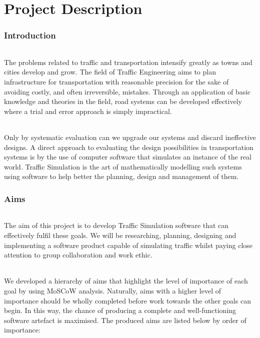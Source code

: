 \documentclass[11pt,a4paper]{article}
\begin{document}
\part{Project Description}

\section{Introduction}
\paragraph{}
The problems related to traffic and transportation intensify greatly as towns and cities develop and grow. The field of Traffic Engineering aims to plan infrastructure for transportation with reasonable precision for the sake of avoiding costly, and often irreversible, mistakes. Through an application of basic knowledge and theories in the field, road systems can be developed effectively where a trial and error approach is simply impractical.

\paragraph{}
Only by systematic evaluation can we upgrade our systems and discard ineffective designs. A direct approach to evaluating the design possibilities in transportation systems is by the use of computer software that simulates an instance of the real world. Traffic Simulation is the art of mathematically modelling such systems using software to help better the planning, design and management of them.

\section{Aims}
\paragraph{}
The aim of this project is to develop Traffic Simulation software that can effectively fulfil these goals. We will be researching, planning, designing and implementing a software product capable of simulating traffic whilst paying close attention to group collaboration and work ethic.

\paragraph{}
We developed a hierarchy of aims that highlight the level of importance of each goal by using MoSCoW analysis. Naturally, aims with a higher level of importance should be wholly completed before work towards the other goals can begin. In this way, the chance of producing a complete and well-functioning software artefact is maximised. The produced aims are listed below by order of importance:
\end{document}
